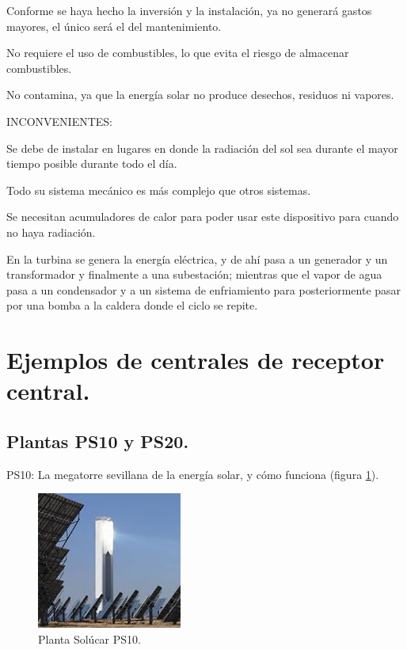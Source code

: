 Conforme se haya hecho la inversión y la instalación, ya no generará gastos mayores, el único será el del mantenimiento.

No requiere el uso de combustibles, lo que evita el riesgo de almacenar combustibles.

No contamina, ya que la energía solar no produce desechos, residuos ni vapores.

INCONVENIENTES:

Se debe de instalar en lugares en donde la radiación del sol sea durante el mayor tiempo posible durante todo el día.

Todo su sistema mecánico es más complejo que otros sistemas.

Se necesitan acumuladores de calor para poder usar este dispositivo para cuando no haya radiación.

En la turbina se genera la energía eléctrica, y de ahí pasa a un generador y un transformador y finalmente a una subestación; mientras que el vapor de agua pasa a un condensador y a un sistema de enfriamiento para posteriormente pasar por una bomba a la caldera donde el ciclo se repite. \cite{IgualadaWebSite} \cite{SoliclimaWebSite} \cite{ClaudioWebSite}

\section{Ejemplos de centrales de receptor central.}
\subsection{Plantas PS10 y PS20.}

PS10: La megatorre sevillana de la energía solar, y cómo funciona (figura \ref{fig:FotosPaginasWebHeliostatos/unnamed(4).jpg}).

\begin{figure}[h!]
  	\centering
	\includegraphics[scale=1]{FotosPaginasWebHeliostatos/unnamed(4).jpg}
	\caption{Planta Solúcar PS10.
	\label{fig:FotosPaginasWebHeliostatos/unnamed(4).jpg}}
\end{figure}

